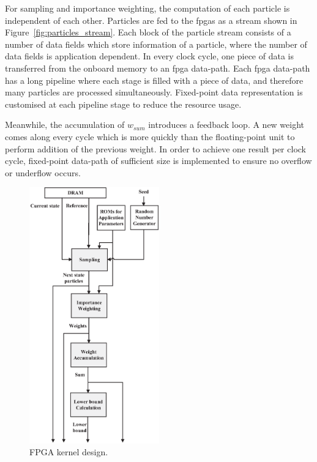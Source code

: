 For sampling and importance weighting, the computation of each particle is independent of each other.
Particles are fed to the \glspl{fpga} as a stream shown in Figure~\ref{fig:particles_stream}.
Each block of the particle stream consists of a number of data fields which store information of a particle, where the number of data fields is application dependent.
In every clock cycle, one piece of data is transferred from the onboard memory to an \gls{fpga} data-path.
Each \gls{fpga} data-path has a long pipeline where each stage is filled with a piece of data, and therefore many particles are processed simultaneously.
Fixed-point data representation is customised at each pipeline stage to reduce the resource usage.

Meanwhile, the accumulation of $w_{sum}$ introduces a feedback loop.
A new weight comes along every cycle which is more quickly than the floating-point unit to perform addition of the previous weight.
In order to achieve one result per clock cycle, fixed-point data-path of sufficient size is implemented to ensure no overflow or underflow occurs.

\begin{figure}[t!]
\centering
\includegraphics[width=0.5\textwidth]{4_adaptation/figures/fig_kernel}
\caption{FPGA kernel design.}
\label{fig:reconfig_kernel}
\end{figure}

